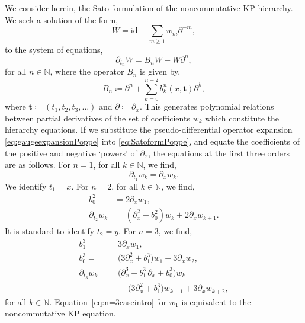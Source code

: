 \documentclass[5p,twocolumn]{elsarticle}
\newcommand*{\id}{{\mathrm{id}}}
\newcommand*{\pa}{{\partial}}
\newcommand*{\tbf}{\boldsymbol{t}}
\begin{document}
We consider herein, the Sato formulation of the noncommutative KP hierarchy. 
We seek a solution of the form,
\begin{equation}\label{eq:gaugeexpansionPoppe}
W=\id-\sum_{m\geqslant1}w_m\pa^{-m}, 
\end{equation}
to the system of equations,
\begin{equation}\label{eq:SatoformPoppe}
  \pa_{t_n}W=B_nW-W\pa^n,
\end{equation}
for all $n\in\mathbb N$, where the operator $B_n$ is given by,
\begin{equation}\label{eq:BopsPoppe}
  B_n\coloneqq\pa^n+\sum_{k=0}^{n-2}b_{k}^{n}(x,\tbf)\pa^k,
\end{equation}
where $\tbf\coloneqq(t_1,t_2,t_3,\ldots)$ and $\pa\coloneqq\pa_x$.
This generates polynomial relations between partial derivatives of the set of coefficients $w_k$ which constitute the hierarchy equations.
If we substitute the pseudo-differential operator expansion \eqref{eq:gaugeexpansionPoppe} into \eqref{eq:SatoformPoppe}, and equate the coefficients
of the positive and negative `powers' of $\pa_x$, the equations at the first three orders are as follows. For $n=1$, for all $k\in\mathbb N$, we find,
\begin{equation}\label{eq:x=t1}
\pa_{t_1}w_k=\pa_xw_k.
\end{equation}
We identify $t_1=x$. For $n=2$, for all $k\in\mathbb N$, we find, 
\begin{subequations}\label{eq:n=2relations}
\begin{align}
  b_{0}^{2}&=2\pa_xw_1,\label{eq:SatoVevol1}\\
  \pa_{t_2}w_k&=(\pa_x^2+b_{0}^{2})w_k+2\pa_xw_{k+1}.\label{eq:SatoVevol2}
\end{align}
\end{subequations}
It is standard to identify $t_2=y$. For $n=3$, we find,
\begin{subequations}
\begin{align}
  b_1^3=&\;3\pa_x w_1,\label{eq:n=3casebn2intro}\\
  b_0^3=&\;\bigl(3\pa_x^2+b_1^3\bigr)w_1+3\pa_xw_2,\label{eq:n=3casebn3intro}\\
  \pa_{t_3}w_k=&\;\bigl(\pa_x^3+b_1^3\,\pa_x+b_0^3\bigr)w_k\nonumber\\
              &\;+\bigl(3\pa_x^2+b_1^3\bigr)w_{k+1}+3\pa_xw_{k+2},\label{eq:n=3caseintro}
\end{align}
\end{subequations}
for all $k\in\mathbb N$. Equation~\eqref{eq:n=3caseintro} for $w_1$ is equivalent to the noncommutative KP equation.
\end{document}
